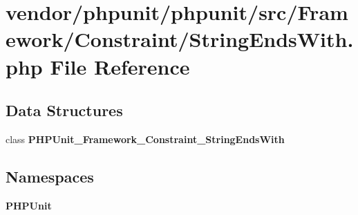 \section{vendor/phpunit/phpunit/src/\+Framework/\+Constraint/\+String\+Ends\+With.php File Reference}
\label{_string_ends_with_8php}
\subsection*{Data Structures}
\begin{DoxyCompactItemize}
\item 
class {\bf P\+H\+P\+Unit\+\_\+\+Framework\+\_\+\+Constraint\+\_\+\+String\+Ends\+With}
\end{DoxyCompactItemize}
\subsection*{Namespaces}
\begin{DoxyCompactItemize}
\item 
 {\bf P\+H\+P\+Unit}
\end{DoxyCompactItemize}
